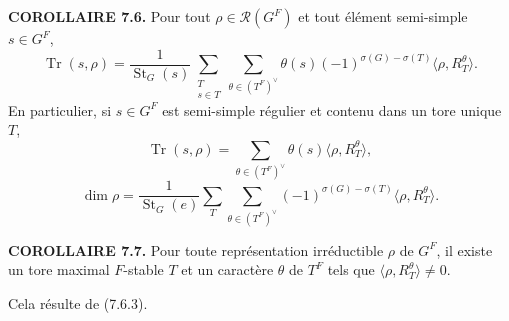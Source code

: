 \documentclass[9pt,twoside]{extarticle}
\begin{document}
{\noindent\textbf{COROLLAIRE 7.6.} Pour tout \(\rho\in\mathcal R(G^F)\) et tout élément semi-simple \(s\in G^F\), \[
\tag{7.6.1}
\operatorname{Tr}(s,\rho)
=\frac1{\operatorname{St}_G(s)}
\sum_{\substack{T\\s\in T}}
\sum_{\theta\in(T^F)^\vee}
\theta(s)(-1)^{\sigma(G)-\sigma(T)}\langle\rho,R_T^\theta\rangle.
\] En particulier, si \(s\in G^F\) est semi-simple régulier et contenu dans un tore unique \(T\), \[
\tag{7.6.2}
\operatorname{Tr}(s,\rho)=
\sum_{\theta\in(T^F)^\vee}\theta(s)\langle\rho,R_T^\theta\rangle,
\]  \[
\tag{7.6.3}
\dim\rho=
\frac1{\operatorname{St}_G(e)}
\sum_T\sum_{\theta\in(T^F)^\vee}
(-1)^{\sigma(G)-\sigma(T)}\langle\rho,R_T^\theta\rangle.
\]\par

\noindent\textbf{COROLLAIRE 7.7.} Pour toute représentation irréductible \(\rho\) de \(G^F\), il existe un tore maximal \(F\)-stable \(T\) et un caractère \(\theta\) de \(T^F\) tels que \(\langle\rho,R_T^\theta\rangle\ne0\).\par

Cela résulte de (7.6.3).\par
}
\end{document}
